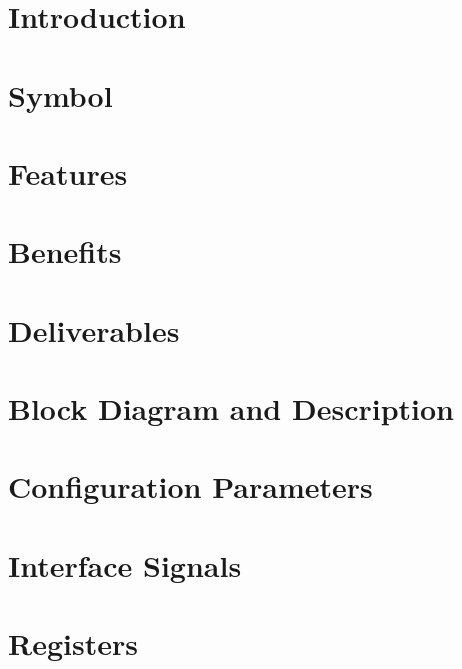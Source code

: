 \documentclass{\TEX/ug/ug}
\begin{document}
\maketitle
\cleardoublepage
\tableofcontents
\listoftables
\listoffigures
\cleardoublepage

\section{Introduction}
\label{sec:intro}


\section{Symbol}
\label{sec:symb}


\section{Features}
\label{sec:feat}


\section{Benefits}
\label{sec:benef}


\section{Deliverables}
\label{sec:deliv}


\section{Block Diagram and Description}
\label{sec:bdd}


\section{Configuration Parameters}
\label{sec:cfgparam}


\section{Interface Signals}
\label{sec:ifsig}


\section{Registers}
\label{sec:regs}

\end{document}
